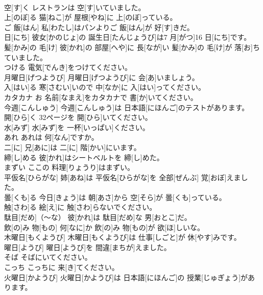\documentclass[8pt]{extreport}
\begin{document}
\begin{CJK}{UTF8}{min}
\\	空[す]く	レストランは 空[す]いていました。		
\\	上[のぼ]る	猫[ねこ]が 屋根[やね]に 上[のぼ]っている。		
\\	ご 飯[はん]	私[わたし]はパンよりご 飯[はん]が 好[す]きだ。		
\\	日[にち]	彼女[かのじょ]の 誕生日[たんじょうび]は7 月[がつ]16 日[にち]です。		
\\	髪[かみ]の 毛[け]	彼[かれ]の 部屋[へや]に 長[なが]い 髪[かみ]の 毛[け]が 落[お]ちていました。		
\\	つける	電気[でんき]をつけてください。		
\\	月曜日[げつようび]	月曜日[げつようび]に 会[あ]いましょう。		
\\	入[はい]る	寒[さむい]いので 中[なか]に 入[はい]ってください。		
\\	カタカナ	お 名前[なまえ]をカタカナで 書[か]いてください。		
\\	今週[こんしゅう]	今週[こんしゅう]は 日本語[にほんご]のテストがあります。		
\\	開[ひら]く	32ページを 開[ひら]いてください。		
\\	水[みず]	水[みず]を 一杯[いっぱい]ください。		
\\	あれ	あれは 何[なん]ですか。		
\\	二[に]	兄[あに]は 二[に] 階[かい]にいます。		
\\	締[し]める	彼[かれ]はシートベルトを 締[し]めた。		
\\	まずい	ここの 料理[りょうり]はまずい。		
\\	平仮名[ひらがな]	姉[あね]は 平仮名[ひらがな]を 全部[ぜんぶ] 覚[おぼ]えました。		
\\	曇[くも]る	今日[きょう]は 朝[あさ]から 空[そら]が 曇[くも]っている。		
\\	触[さわ]る	絵[え]に 触[さわ]らないでください。		
\\	駄目[だめ]（～な）	彼[かれ]は 駄目[だめ]な 男[おとこ]だ。		
\\	飲[の]み 物[もの]	何[なに]か 飲[の]み 物[もの]が 欲[ほ]しいな。		
\\	木曜日[もくようび]	木曜日[もくようび]は 仕事[しごと]が 休[やす]みです。		
\\	曜日[ようび]	曜日[ようび]を 間違[まちが]えました。		
\\	そば	そばにいてください。		
\\	こっち	こっちに 来[き]てください。		
\\	火曜日[かようび]	火曜日[かようび]は 日本語[にほんご]の 授業[じゅぎょう]があります。		

\end{CJK}
\end{document}

